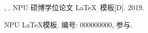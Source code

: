 \documentclass[oneside, UTF8, phd, AutoFakeBold]{nputhesis}
\begin{document}
\printbibliography             %

\Appendix   %

\Appendix*  %

\Thanks     %

\Work
\papersection  %

\begin{npulist}
  \item {\bf {}}, . NPU 硕博学位论文
    \LaTeX\ 模板[D]. 2019.
\end{npulist}

\researchsection %
\begin{npulist}
  \item NPU \LaTeX 模板.   编号: 000000000, 参与.
\end{npulist}
\statement
\end{document}
